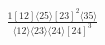 \documentclass[varwidth, border=5pt]{standalone}
\begin{document}
\begin{my}
$\begin{gathered}
\scriptscriptstyle\frac{1[12]⟨25⟩[23]^2⟨35⟩}{⟨12⟩⟨23⟩⟨24⟩[24]^3}
\end{gathered}$
\end{my}
\end{document}
